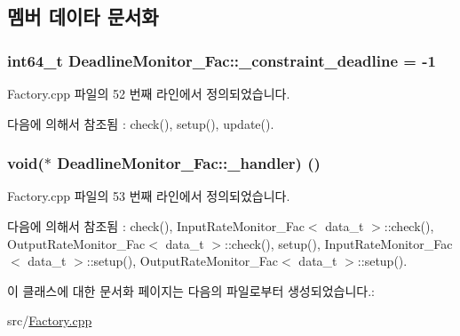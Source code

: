 \subsection{멤버 데이타 문서화}
\subsubsection[{\texorpdfstring{\+\_\+constraint\+\_\+deadline}{_constraint_deadline}}]{\setlength{\rightskip}{0pt plus 5cm}int64\+\_\+t Deadline\+Monitor\+\_\+\+Fac\+::\+\_\+constraint\+\_\+deadline = -\/1\hspace{0.3cm}{\ttfamily [private]}}\hypertarget{classDeadlineMonitor__Fac_a8fe1a647054d4ead7e9d41869bef0234}{}\label{classDeadlineMonitor__Fac_a8fe1a647054d4ead7e9d41869bef0234}


Factory.\+cpp 파일의 52 번째 라인에서 정의되었습니다.



다음에 의해서 참조됨 \+:  check(), setup(), update().

\subsubsection[{\texorpdfstring{\+\_\+handler}{_handler}}]{\setlength{\rightskip}{0pt plus 5cm}void($\ast$ Deadline\+Monitor\+\_\+\+Fac\+::\+\_\+handler) ()\hspace{0.3cm}{\ttfamily [private]}}\hypertarget{classDeadlineMonitor__Fac_ae36ff128554a0ba47cbcca57543586bb}{}\label{classDeadlineMonitor__Fac_ae36ff128554a0ba47cbcca57543586bb}


Factory.\+cpp 파일의 53 번째 라인에서 정의되었습니다.



다음에 의해서 참조됨 \+:  check(), Input\+Rate\+Monitor\+\_\+\+Fac$<$ data\+\_\+t $>$\+::check(), Output\+Rate\+Monitor\+\_\+\+Fac$<$ data\+\_\+t $>$\+::check(), setup(), Input\+Rate\+Monitor\+\_\+\+Fac$<$ data\+\_\+t $>$\+::setup(), Output\+Rate\+Monitor\+\_\+\+Fac$<$ data\+\_\+t $>$\+::setup().



이 클래스에 대한 문서화 페이지는 다음의 파일로부터 생성되었습니다.\+:\begin{DoxyCompactItemize}
\item 
src/\hyperlink{Factory_8cpp}{Factory.\+cpp}\end{DoxyCompactItemize}
